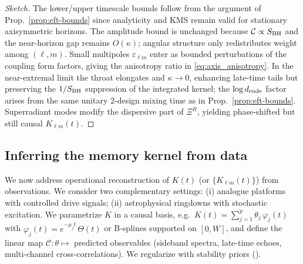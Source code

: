 \documentclass[a4paper,11pt]{article}
\theoremstyle{plain}
\theoremstyle{definition}
\theoremstyle{remark}
\begin{document}
\begin{proof}[Sketch]
The lower/upper timescale bounds follow from the argument of Prop.~\ref{prop:eft-bounds} since analyticity and KMS remain valid for
stationary axisymmetric horizons. The amplitude bound is unchanged because $\mathcal{C}\propto S_{\rm BH}$ and the near-horizon gap
remains $O(\kappa)$; angular structure only redistributes weight among $(\ell,m)$. Small multipoles $\varepsilon_{\ell m}$ enter as
bounded perturbations of the coupling form factors, giving the anisotropy ratio in \eqref{eq:axis_anisotropy}. In the near-extremal
limit the throat elongates and $\kappa\to 0$, enhancing late-time tails but preserving the $1/S_{\rm BH}$ suppression of the integrated
kernel; the $\log d_{\rm code}$ factor arises from the same unitary $2$-design mixing time as in Prop.~\ref{prop:eft-bounds}. Superradiant
modes modify the dispersive part of $\Xi^R$, yielding phase-shifted but still causal $K_{\ell m}(t)$.\end{proof}

\subsection{Inferring the memory kernel from data}
\label{sec:inference}
We now address operational reconstruction of $K(t)$ (or $\{K_{\ell m}(t)\}$) from observations. We consider two complementary
settings: (i) analogue platforms with controlled drive signals; (ii) astrophysical ringdowns with stochastic excitation.
We parametrize $K$ in a causal basis, e.g.\ $K(t)=\sum_{j=1}^{p}\theta_j\,\varphi_j(t)$ with $\varphi_j(t)=e^{-\mu_j t}\,\Theta(t)$
or B-splines supported on $[0,W]$, and define the linear map $\mathcal{C}:\theta\mapsto$ predicted observables (sideband spectra,
late-time echoes, multi-channel cross-correlations). We regularize with stability priors ().
\end{document}
